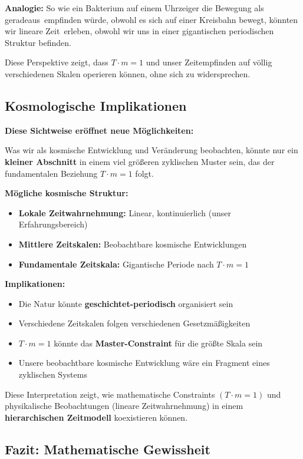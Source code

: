 \textbf{Analogie:} So wie ein Bakterium auf einem Uhrzeiger die Bewegung als \glqq geradeaus\grqq\ empfinden würde, obwohl es sich auf einer Kreisbahn bewegt, könnten wir \glqq lineare Zeit\grqq\ erleben, obwohl wir uns in einer gigantischen periodischen Struktur befinden.

Diese Perspektive zeigt, dass $T \cdot m = 1$ und unser Zeitempfinden auf völlig verschiedenen Skalen operieren können, ohne sich zu widersprechen.

\subsection{Kosmologische Implikationen}

\textbf{Diese Sichtweise eröffnet neue Möglichkeiten:}

Was wir als kosmische Entwicklung und Veränderung beobachten, könnte nur ein \textbf{kleiner Abschnitt} in einem viel größeren zyklischen Muster sein, das der fundamentalen Beziehung $T \cdot m = 1$ folgt.

\textbf{Mögliche kosmische Struktur:}
\begin{itemize}
	\item \textbf{Lokale Zeitwahrnehmung:} Linear, kontinuierlich (unser Erfahrungsbereich)
	\item \textbf{Mittlere Zeitskalen:} Beobachtbare kosmische Entwicklungen
	\item \textbf{Fundamentale Zeitskala:} Gigantische Periode nach $T \cdot m = 1$
\end{itemize}

\textbf{Implikationen:}
\begin{itemize}
	\item Die Natur könnte \textbf{geschichtet-periodisch} organisiert sein
	\item Verschiedene Zeitskalen folgen verschiedenen Gesetzmäßigkeiten
	\item $T \cdot m = 1$ könnte das \textbf{Master-Constraint} für die größte Skala sein
	\item Unsere beobachtbare kosmische Entwicklung wäre ein Fragment eines zyklischen Systems
\end{itemize}

Diese Interpretation zeigt, wie mathematische Constraints $(T \cdot m = 1)$ und physikalische Beobachtungen (lineare Zeitwahrnehmung) in einem \textbf{hierarchischen Zeitmodell} koexistieren können.

\subsection{Fazit: Mathematische Gewissheit}

